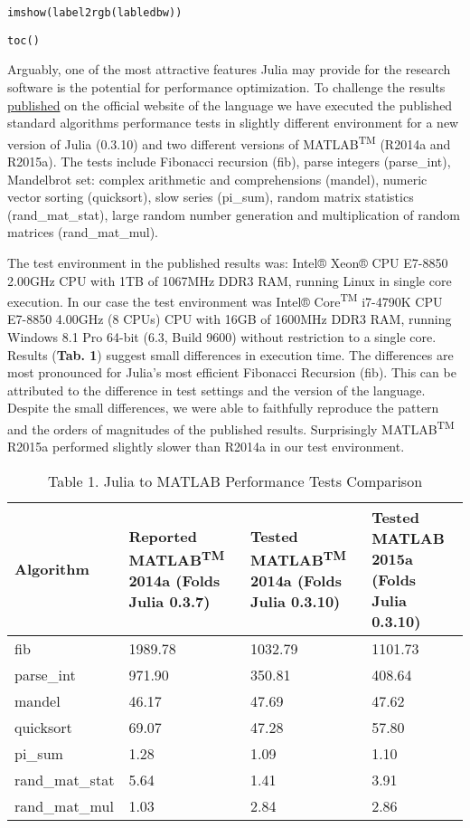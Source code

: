 \verb|imshow(label2rgb(labledbw))|

\verb|toc()|

Arguably, one of the most attractive features Julia may provide for the research software is the potential for performance optimization. To challenge the results \href{http://julialang.org/benchmarks/}{published} on the official website of the language we have executed the published standard algorithms performance tests in slightly different environment for a new version of Julia (0.3.10) and two different versions of MATLAB\textsuperscript{TM} (R2014a and R2015a). The tests include Fibonacci recursion (fib), parse integers (parse\_int), Mandelbrot set: complex arithmetic and comprehensions (mandel), numeric vector sorting (quicksort), slow \pi series (pi\_sum), random matrix statistics (rand\_mat\_stat), large random number generation and multiplication of random matrices (rand\_mat\_mul).

The test environment in the published results was: Intel® Xeon® CPU E7-8850 2.00GHz CPU with 1TB of 1067MHz DDR3 RAM, running Linux in single core execution. In our case the test environment was Intel® Core\textsuperscript{TM} i7-4790K CPU E7-8850 4.00GHz (8 CPUs) CPU with 16GB of 1600MHz DDR3 RAM, running Windows 8.1 Pro 64-bit (6.3, Build 9600) without restriction to a single core. Results (\textbf{Tab. 1}) suggest small differences in execution time. The differences are most pronounced for Julia's most efficient Fibonacci Recursion (fib). This can be attributed to the difference in test settings and the version of the language. Despite the small differences, we were able to faithfully reproduce the pattern and the orders of magnitudes of the published results. Surprisingly MATLAB\textsuperscript{TM} R2015a performed slightly slower than R2014a in our test environment.

\begin{table} 
    \begin{tabular}{llll}
    \hline
        Algorithm & Reported MATLAB\textsuperscript{TM} 2014a (Folds Julia 0.3.7) & Tested MATLAB\textsuperscript{TM} 2014a (Folds Julia 0.3.10) & Tested MATLAB 2015a (Folds Julia 0.3.10) \\
        \hline
        fib & 1989.78 & 1032.79 & 1101.73 \\ 
        \hline
        parse\_int & 971.90 & 350.81 & 408.64 \\ 
        \hline
        mandel & 46.17 & 47.69 & 47.62 \\ 
        \hline
        quicksort & 69.07 & 47.28 & 57.80 \\ 
        \hline
        pi\_sum & 1.28 & 1.09 & 1.10 \\ 
        \hline
        rand\_mat\_stat & 5.64 & 1.41 & 3.91 \\ 
        \hline
        rand\_mat\_mul & 1.03 & 2.84 & 2.86 \\ 
    \end{tabular}
    \caption{Table 1. Julia to MATLAB Performance Tests Comparison}
\end{table}


